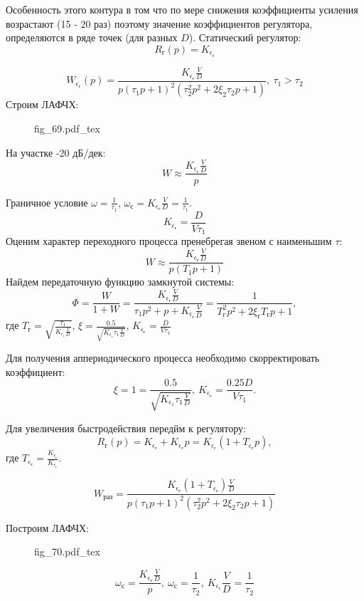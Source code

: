 \documentclass{article}
\newcommand{\incfig}[1]{
    {#1.pdf_tex}
}
\begin{document}
Особенность этого контура в том что по мере снижения коэффициенты усиления возрастают (15 - 20 раз) поэтому значение коэффициентов регулятора, определяются в ряде точек (для разных $D$).
Статический регулятор:
\[
    R_\text{г}(p) = K_{\epsilon_\text{г}}
\]

\[
    W_{\epsilon_\text{г}}(p)= \frac{K_{\epsilon_\text{г}} \frac{V}{D}}{p(\tau_{1}p + 1)^2 ( \tau_2^2 p^2 + 2 \xi_2 \tau_2 p + 1 )}, \ \tau_1 > \tau_2
\]
Строим ЛАФЧХ:
\begin{figure}[H]
    \centering
    \incfig{fig_69}
    \label{fig:fig_69}
\end{figure}
На участке -20 дБ/дек:
\[
    W \approx \frac{K_{\epsilon_\text{г}} \frac{V}{D}}{p}
\]

Граничное условие $\omega = \frac{1}{\tau_1}$, $\omega_\text{с} = K_{\epsilon_\text{г}} \frac{V}{D} = \frac{1}{\tau_1}$.
\[
    K_{\epsilon_\text{г}} = \frac{D}{V \tau_1}
\]
Оценим характер переходного процесса пренебрегая звеном с наименьшим $\tau$:
\[
    W \approx \frac{K_{\epsilon_\text{г}} \frac{V}{D}}{p (T_1 p + 1)}
\]
Найдем передаточную функцию замкнутой системы:
\[
    \Phi = \frac{W}{1 + W} = \frac{K_{\epsilon_\text{г}} \frac{V}{D}}{\tau_1 p^2 + p + K_{\epsilon_\text{г}} \frac{V}{D}}= \frac{1}{ T_\text{г}^2 p^2 + 2 \xi_\text{г} T_\text{г} p + 1 },
\]
где $T_\text{г} = \sqrt{ \frac{\tau_1}{K_{\epsilon_\text{г}} \frac{V}{D}}}$, $\xi = \frac{0.5}{\sqrt{K_{\epsilon_\text{г}} \tau_1 \frac{V}{D}}}$,
$K_{\epsilon_\text{г}} = \frac{D}{V \tau_1}$

Для получения аппериодического процесса необходимо скорректировать коэффициент:
\[
    \xi = 1 = \frac{0.5}{\sqrt{K_{\epsilon_1} \tau_1 \frac{V}{D}}}, \ K_{\epsilon_\text{г}} = \frac{ 0.25 D}{V \tau_1}.
\]


Для увеличения быстродействия передйм к регулятору:
\[
    R_\text{г} (p) = K_{\epsilon_\text{г}} + K_{\dot{\epsilon}_\text{г}}p = K_{\epsilon_\text{г}}(1 + T_{\epsilon_\text{г}} p), 
\]
где $T_{\epsilon_{\text{г}}} = \frac{K_{\dot{\epsilon}_{\text{г}}}}{K_{\epsilon_\text{г}}}$. 

\[
    W_\text{раз} = \frac{K_{\epsilon_\text{г}}(1 +  T_{\epsilon_\text{г}} ) \frac{V}{D}}{p(\tau_{1}p + 1)^2 ( \tau_2^2 p^2 + 2 \xi_2 \tau_2 p + 1 )}
\]

Построим ЛАФЧХ:
\begin{figure}[H]
    \centering
    \incfig{fig_70}
    \label{fig:fig_70}
\end{figure}

\[
    \omega_\text{с}   = \frac{K_{\epsilon_\text{г}} \frac{V}{D}}{p}, \ \omega_\text{с} = \frac{1}{\tau_2}, \ K_{\epsilon_\text{г}} \frac{V}{D} = \frac{1}{\tau_2}
\]
\end{document}
